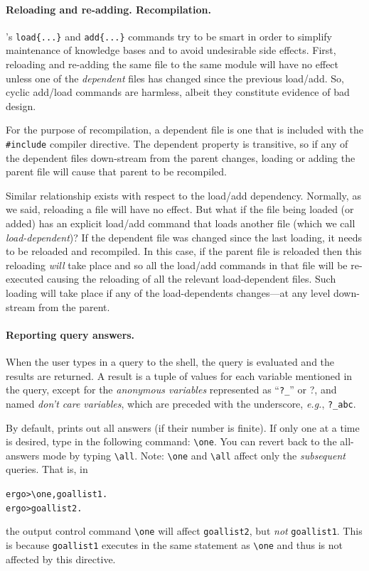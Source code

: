 \documentclass[11pt]{article}
\newcommand{\ERGO}{\mbox{\smaller{\ensuremath{\cal{E}}\smaller{{\sc{RGO}}}}}\xspace}
\newcommand{\FLSYSTEM}{\ERGO}
\newcommand{\prompt}{ergo> }
\newcommand{\anon}{?}
\newcommand{\bs}{\textbackslash}
\begin{document}
\paragraph{Reloading and re-adding. Recompilation.}
\FLSYSTEM's \texttt{load\{...\}}  and \texttt{add\{...\}} commands try to be smart in
order to simplify maintenance of knowledge bases and to avoid undesirable
side effects. First, reloading and re-adding the same file to the same
module will have no effect unless one of the \emph{dependent} files has
changed since the previous load/add. So, cyclic add/load commands
are harmless, albeit they constitute evidence of bad design.

For the purpose of recompilation, a dependent file is
one that is included with the \texttt{\#include} compiler directive.
The dependent property is
transitive, so if any of the dependent files down-stream from the parent changes, loading
or adding  the parent file will cause that parent to be recompiled.

Similar relationship exists with respect to the load/add dependency.
Normally, as we said, reloading a file will have no effect. But what if the
file being loaded (or added) has an explicit load/add command that loads
another file (which we call \emph{load-dependent})? If the dependent file
was changed since the last loading, it needs to be reloaded and recompiled. In this case, if the parent file is
reloaded then this reloading \emph{will} take place and so all the
load/add commands in that file will be re-executed causing the reloading
of all the relevant 
load-dependent files. Such loading will
take place if any of the load-dependents changes---at any level down-stream from the
parent.

\paragraph{Reporting query answers.}
When the user types in a query to the shell, the query is evaluated and the
results are returned. A result is a tuple of values for each variable
mentioned in the query, except for the \emph{anonymous variables}
represented as ``{\tt ?\_}'' or \anon, and named {\em don't care
variables}, which are
preceded with the underscore, {\it e.g.}, {\tt ?\_abc}.

By default, \FLSYSTEM prints out all answers (if their number is finite). If only one at a time is
desired, type in the following command: {\tt \bs{}one}. You can revert back to
the all-answers mode by typing {\tt \bs{}all}. Note: {\tt \bs{}one} and {\tt \bs{}all}
affect only the \emph{subsequent} queries. That is, in
\begin{alltt}
     \prompt \bs{}one, goallist1.
     \prompt goallist2.
\end{alltt}
the output control command {\tt \bs{}one} will affect {\tt goallist2},
but \emph{not} {\tt goallist1}. This is because {\tt goallist1} executes in
the same statement as {\tt \bs{}one} and thus is not affected by this directive.
\end{document}
